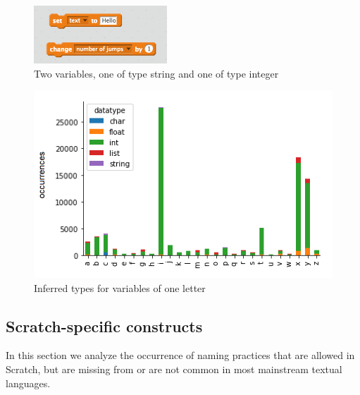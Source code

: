 \documentclass[conference]{IEEEtran}
\begin{document}
\begin{figure}
	\begin{center}
		\includegraphics[width=5cm]{fig/types}
		\caption{Two variables, one of type string and one of type integer}
		\label{fig:types}
	\end{center}
\end{figure} 
\begin{figure}
	\begin{center}
		\includegraphics[width=\columnwidth]{fig/singleletter_type_occurrences}
		\caption{Inferred types for variables of one letter}
		\label{fig:one_letter_type}
	\end{center}
\end{figure} 

\subsection{Scratch-specific constructs}
\label{res:Scratch:specific}
In this section we analyze the occurrence of naming practices that are allowed in Scratch, but are missing from or are not common in most mainstream textual languages.
\end{document}
